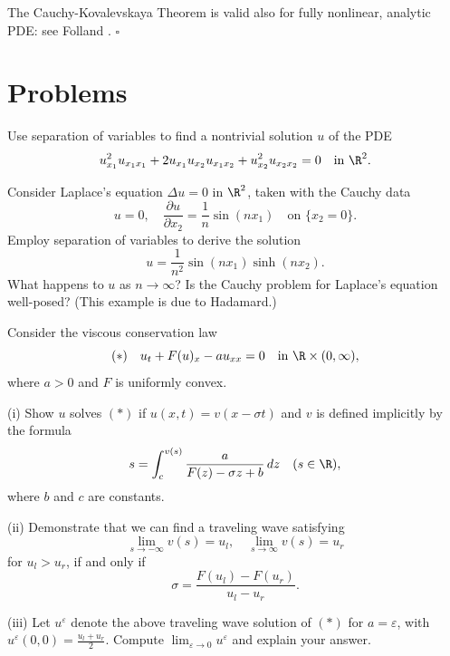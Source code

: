 \begin{remark}
\label{rem:cauchy-kovalevskaya-fully-nonlinear}
The Cauchy-Kovalevskaya Theorem is valid also for fully nonlinear, analytic PDE: see Folland \cite{Folland1976}. $\square$
\end{remark}

\section{Problems}
\label{sec:ch4-problems}

\begin{exercise}
Use separation of variables to find a nontrivial solution $u$ of the PDE
$$u^2_{x_1}u_{x_1x_1} + 2u_{x_1}u_{x_2}u_{x_1x_2} + u^2_{x_2}u_{x_2x_2} = 0 \quad \text{in } \R^2.$$
\end{exercise}

\begin{exercise}
Consider Laplace's equation $\Delta u = 0$ in $\R^2$, taken with the Cauchy data
$$u = 0, \quad \frac{\partial u}{\partial x_2} = \frac{1}{n}\sin(nx_1) \quad \text{on } \{x_2 = 0\}.$$
Employ separation of variables to derive the solution
$$u = \frac{1}{n^2} \sin(nx_1) \sinh(nx_2).$$
What happens to $u$ as $n \to \infty$? Is the Cauchy problem for Laplace's equation well-posed? (This example is due to Hadamard.)
\end{exercise}

\begin{exercise}
Consider the viscous conservation law
$$(*)  \quad u_t + F(u)_x - au_{xx} = 0 \quad \text{in } \R \times (0, \infty),$$
where $a > 0$ and $F$ is uniformly convex.

(i) Show $u$ solves $(*)$ if $u(x, t) = v(x - \sigma t)$ and $v$ is defined implicitly by the formula
$$s = \int_c^{v(s)} \frac{a}{F(z) - \sigma z + b} \, dz \quad (s \in \R),$$
where $b$ and $c$ are constants.

(ii) Demonstrate that we can find a traveling wave satisfying
$$\lim_{s \to -\infty} v(s) = u_l, \quad \lim_{s \to \infty} v(s) = u_r$$
for $u_l > u_r$, if and only if
$$\sigma = \frac{F(u_l) - F(u_r)}{u_l - u_r}.$$

(iii) Let $u^\varepsilon$ denote the above traveling wave solution of $(*)$ for $a = \varepsilon$, with $u^\varepsilon(0, 0) = \frac{u_l + u_r}{2}$. Compute $\lim_{\varepsilon \to 0} u^\varepsilon$ and explain your answer.
\end{exercise}

